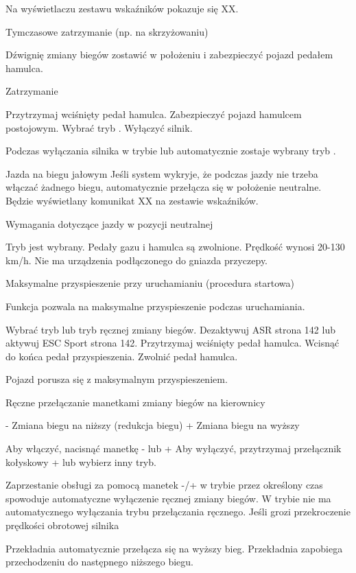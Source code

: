 Na wyświetlaczu zestawu wskaźników pokazuje się XX.

Tymczasowe zatrzymanie (np. na skrzyżowaniu)

\begin{itemizeArrow}
	\itemArrow Dźwignię zmiany biegów zostawić w położeniu \gearDS i zabezpieczyć pojazd pedałem hamulca.
\end{itemizeArrow}

Zatrzymanie
\begin{itemizeArrow}
	\itemArrow Przytrzymaj wciśnięty pedał hamulca.
	\itemArrow Zabezpieczyć pojazd hamulcem postojowym.
	\itemArrow Wybrać tryb \gearP.
	\itemArrow Wyłączyć silnik.
\end{itemizeArrow}

Podczas wyłączania silnika w trybie \gearDS lub \gearR automatycznie zostaje wybrany tryb \gearP.

Jazda na biegu jałowym
Jeśli system wykryje, że podczas jazdy nie trzeba włączać żadnego biegu, automatycznie przełącza się w położenie neutralne.
Będzie wyświetlany komunikat XX na zestawie wskaźników.

Wymagania dotyczące jazdy w pozycji neutralnej
\begin{itemizeTick}
	\itemTick Tryb \gearD jest wybrany.
	\itemTick Pedały gazu i hamulca są zwolnione.
	\itemTick Prędkość wynosi 20-130 km/h.
	\itemTick Nie ma urządzenia podłączonego do gniazda przyczepy.
\end{itemizeTick}

Maksymalne przyspieszenie przy uruchamianiu (procedura startowa)

Funkcja pozwala na maksymalne przyspieszenie podczas uruchamiania.

\begin{itemizeArrow}
	\itemArrow Wybrać tryb \gearS lub tryb ręcznej zmiany biegów.
	\itemArrow Dezaktywuj ASR \guillemotright strona 142 lub aktywuj ESC Sport \guillemotright strona 142.
	\itemArrow Przytrzymaj wciśnięty pedał hamulca.
	\itemArrow Wcisnąć do końca pedał przyspieszenia.
	\itemArrow Zwolnić pedał hamulca.
\end{itemizeArrow}

Pojazd porusza się z maksymalnym przyspieszeniem.

Ręczne przełączanie manetkami zmiany biegów na kierownicy

- Zmiana biegu na niższy (redukcja biegu)
+ Zmiana biegu na wyższy

\begin{itemizeArrow}
	\itemArrow Aby włączyć, nacisnąć manetkę - lub +
	\itemArrow Aby wyłączyć, przytrzymaj przełącznik kołyskowy + lub wybierz inny tryb.
\end{itemizeArrow}
Zaprzestanie obsługi za pomocą manetek -/+ w trybie przez określony czas spowoduje automatyczne wyłączenie ręcznej zmiany biegów.
W trybie nie ma automatycznego wyłączania trybu przełączania ręcznego.
Jeśli grozi przekroczenie prędkości obrotowej silnika
\begin{itemizeTriangle}
	\itemTriangle Przekładnia automatycznie przełącza się na wyższy bieg.
	\itemTriangle Przekładnia zapobiega przechodzeniu do następnego niższego biegu.
\end{itemizeTriangle}

